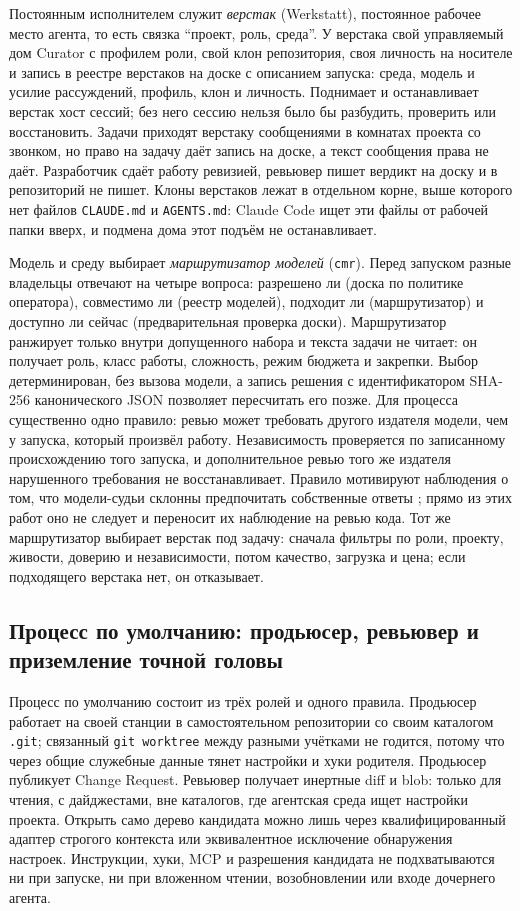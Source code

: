 \documentclass[10pt,a4paper]{article}
\begin{document}
Постоянным исполнителем служит \emph{верстак} (Werkstatt), постоянное рабочее место агента, то есть связка ``проект, роль, среда''. У верстака свой управляемый дом Curator с профилем роли, свой клон репозитория, своя личность на носителе и запись в реестре верстаков на доске с описанием запуска: среда, модель и усилие рассуждений, профиль, клон и личность. Поднимает и останавливает верстак хост сессий; без него сессию нельзя было бы разбудить, проверить или восстановить. Задачи приходят верстаку сообщениями в комнатах проекта со звонком, но право на задачу даёт запись на доске, а текст сообщения права не даёт. Разработчик сдаёт работу ревизией, ревьювер пишет вердикт на доску и в репозиторий не пишет. Клоны верстаков лежат в отдельном корне, выше которого нет файлов \texttt{CLAUDE.md} и \texttt{AGENTS.md}: Claude Code ищет эти файлы от рабочей папки вверх, и подмена дома этот подъём не останавливает.

Модель и среду выбирает \emph{маршрутизатор моделей} (\texttt{cmr}). Перед запуском разные владельцы отвечают на четыре вопроса: разрешено ли (доска по политике оператора), совместимо ли (реестр моделей), подходит ли (маршрутизатор) и доступно ли сейчас (предварительная проверка доски). Маршрутизатор ранжирует только внутри допущенного набора и текста задачи не читает: он получает роль, класс работы, сложность, режим бюджета и закрепки. Выбор детерминирован, без вызова модели, а запись решения с идентификатором SHA-256 канонического JSON позволяет пересчитать его позже. Для процесса существенно одно правило: ревью может требовать другого издателя модели, чем у запуска, который произвёл работу. Независимость проверяется по записанному происхождению того запуска, и дополнительное ревью того же издателя нарушенного требования не восстанавливает. Правило мотивируют наблюдения о том, что модели-судьи склонны предпочитать собственные ответы \cite{selfpref,llmjudge}; прямо из этих работ оно не следует и переносит их наблюдение на ревью кода. Тот же маршрутизатор выбирает верстак под задачу: сначала фильтры по роли, проекту, живости, доверию и независимости, потом качество, загрузка и цена; если подходящего верстака нет, он отказывает.

\subsection{Процесс по умолчанию: продьюсер, ревьювер и приземление точной головы}

Процесс по умолчанию состоит из трёх ролей и одного правила. Продьюсер работает на своей станции в самостоятельном репозитории со своим каталогом \texttt{.git}; связанный \texttt{git worktree} между разными учётками не годится, потому что через общие служебные данные тянет настройки и хуки родителя. Продьюсер публикует Change Request. Ревьювер получает инертные diff и blob: только для чтения, с дайджестами, вне каталогов, где агентская среда ищет настройки проекта. Открыть само дерево кандидата можно лишь через квалифицированный адаптер строгого контекста или эквивалентное исключение обнаружения настроек. Инструкции, хуки, MCP и разрешения кандидата не подхватываются ни при запуске, ни при вложенном чтении, возобновлении или входе дочернего агента.
\end{document}
